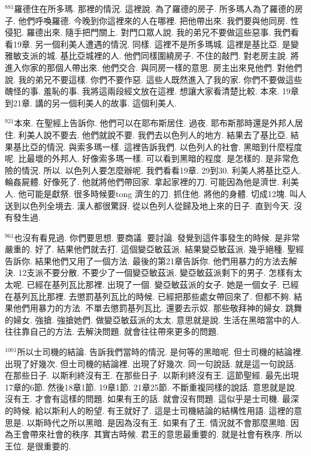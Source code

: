 \documentclass{book}
\begin{document}
$^{881}$羅德住在所多瑪.
那裡的情況.
這裡說.
為了羅德的房子.
所多瑪人為了羅德的房子.
他們呼喚羅德.
今晚到你這裡來的人在哪裡.
把他帶出來.
我們要與他同房.
性侵犯.
羅德出來.
隨手把門關上.
對門口眾人說.
我的弟兄不要做這些惡事.
我們看看19章.
另一個利美人遭遇的情況.
同樣.
這裡不是所多瑪城.
這裡是基比亞.
是變雅敏支派的城.
基比亞城裡的人.
他們同樣圍繞房子.
不住的敲門.
對老房主說.
將進入你家的那個人帶出來.
他們交合.
與同房一樣的意思.
房主出來見他們.
對他們說.
我的弟兄不要這樣.
你們不要作惡.
這些人既然進入了我的家.
你們不要做這些醜怪的事.
羞恥的事.
我將這兩段經文放在這裡.
想讓大家看清楚比較.
本來.
19章到21章.
講的另一個利美人的故事.
這個利美人.

$^{921}$本來.
在聖經上告訴你.
他們可以在耶布斯居住.
過夜.
耶布斯那時還是外邦人居住.
利美人說不要去.
他們就說不要.
我們去以色列人的地方.
結果去了基比亞.
結果基比亞的情況.
與索多瑪一樣.
這裡告訴我們.
以色列人的社會.
黑暗到什麼程度呢.
比最壞的外邦人.
好像索多瑪一樣.
可以看到黑暗的程度.
是怎樣的.
是非常危險的情況.
所以.
以色列人要怎麼辦呢.
我們看看19章.
29到30.
利美人將基比亞人.
輪姦屍體.
好像死了.
他就將他們帶回家.
拿起家裡的刀.
可能因為他是濟世.
利美人.
他可能是獻祭.
很多時候要tong 濟生的刀.
抓住他.
將他的身體.
切成12塊.
叫人送到以色列全境去.
漢人都很驚訝.
從以色列人從歸及地上來的日子.
直到今天.
沒有發生過.

$^{961}$也沒有看見過.
你們要思想.
要商議.
要討論.
發覺到這件事發生的時候.
是非常嚴重的.
好了.
結果他們就去打.
這個變亞敏茲派.
結果變亞敏茲派.
幾乎絕種.
聖經告訴你.
結果他們又用了一個方法.
最後的第21章告訴你.
他們用暴力的方法去解決.
12支派不要分散.
不要少了一個變亞敏茲派.
變亞敏茲派剩下的男子.
怎樣有太太呢.
已經在基列瓦比那裡.
出現了一個.
變亞敏茲派的女子.
她是一個女子.
已經在基列瓦比那裡.
去懲罰基列瓦比的時候.
已經把那些處女帶回來了.
但都不夠.
結果他們用暴力的方法.
不單去懲罰基列瓦比.
還要去示奴.
那些敬拜神的婦女.
跳舞的婦女.
強搶.
強搶她們.
做變亞敏茲派的太太.
意思就是說.
生活在黑暗當中的人.
往往靠自己的方法.
去解決問題.
就會往往帶來更多的問題.

$^{1001}$所以士司機的結論.
告訴我們當時的情況.
是何等的黑暗呢.
但士司機的結論裡.
出現了好幾次.
但士司機的結論裡.
出現了好幾次.
同一句說話.
就是這一句說話.
在那些日子.
以斯利終沒有王.
在那些日子.
以斯利終沒有王.
這節聖經.
最先出現17章的6節.
然後18章1節.
19章1節.
21章25節.
不斷重複同樣的說話.
意思就是說.
沒有王.
才會有這樣的問題.
如果有王的話.
就會沒有問題.
這似乎是士司機.
最深的時候.
給以斯利人的盼望.
有王就好了.
這是士司機結論的結構性用語.
這裡的意思是.
以斯時代之所以黑暗.
是因為沒有王.
如果有了王.
情況就不會那麼黑暗.
因為王會帶來社會的秩序.
其實古時候.
君王的意思最重要的.
就是社會有秩序.
所以王位.
是很重要的.
\end{document}
